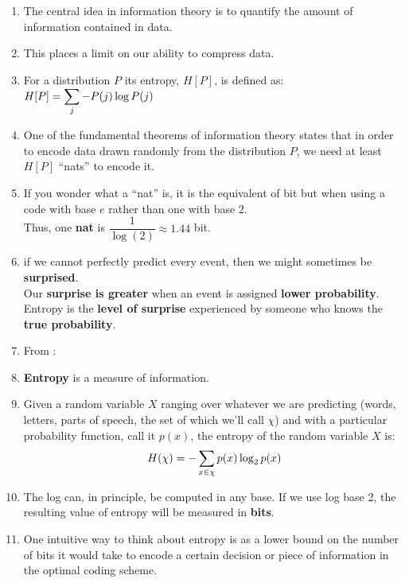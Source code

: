 \begin{enumerate}[itemsep=0.2cm]
    \item The central idea in information theory is to quantify the amount of information contained in data. 
    
    \item This places a limit on our ability to compress data.

    \item For a distribution $P$ its entropy, $H[P]$, is defined as:
    $
        \hfill
        H[P] 
        = \dsum_j - P(j) \log P(j)
        \hfill
    $

    \item One of the fundamental theorems of information theory states that in order to encode data drawn randomly from the distribution $P$, we need at least $H[P]$ “nats” to encode it.

    \item If you wonder what a “nat” is, it is the equivalent of bit but when using a code with base $e$ rather than one with base $2$. \\
    Thus, one \textbf{nat} is $\dfrac{1}{\log(2)} \approx 1.44$ bit.

    \item if we cannot perfectly predict every event, then we might sometimes be \textbf{surprised}.\\
    Our \textbf{surprise is greater} when an event is assigned \textbf{lower probability}.\\
    Entropy is the \textbf{level of surprise} experienced by someone who knows the \textbf{true probability}.

    \item[] From \cite{nlp-1}:

    \item \textbf{Entropy} is a measure of information.

    \item Given a random variable $X$ ranging over whatever we are predicting (words, letters, parts of speech, the set of which we’ll call $\chi$) and with a particular probability function, call it $p(x)$, the entropy of the random variable $X$ is:
    \[
        H(\chi) = - \displaystyle\sum_{x \in \chi} p(x)\log_2p(x)
    \]

    \item The log can, in principle, be computed in any base. If we use log base 2, the resulting value of entropy will be measured in \textbf{bits}.

    \item One intuitive way to think about entropy is as a lower bound on the number of bits it would take to encode a certain decision or piece of information in the optimal coding scheme.

\end{enumerate}





